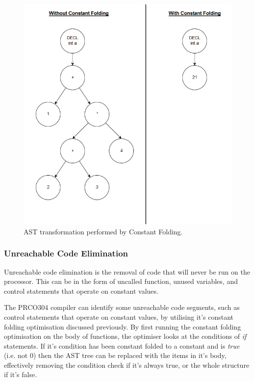 \documentclass[11pt,a4paper]{report}
\newcommand{\scname}{PRCO304}
\begin{document}
\begin{figure}[H]
\begin{center}
\includegraphics[scale=0.4]{compiler_cf}
\end{center}
\caption{AST transformation performed by Constant Folding.}
\label{fig:constant_fold_ast}
\end{figure}



\subsubsection{Unreachable Code Elimination}
Unreachable code elimination is the removal of code that will never be run on the processor. This can be in the form of uncalled function, unused variables, and control statements that operate on constant values.

The \scname{} compiler can identify some unreachable code segments, such as control statements that operate on constant values, by utilising it's constant folding optimisation discussed previously. By first running the constant folding optimisation on the body of functions, the optimiser looks at the conditions of \textit{if} statements. If it's condition has been constant folded to a constant and is \textit{true} (i.e. not 0) then the AST tree can be replaced with the items in it's body, effectively removing the condition check if it's always true, or the whole structure if it's false.
\end{document}
